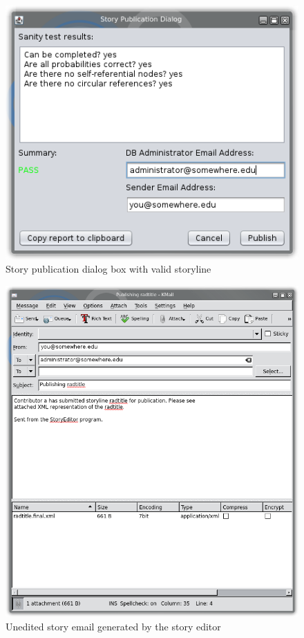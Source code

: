 \documentclass[12pt,letterpaper]{article}
\begin{document}
\begin{figure}
    \begin{center}
        \includegraphics[scale=1]{publicationbox.png}
    \end{center}
    \caption{Story publication dialog box with valid storyline}
\end{figure}

\begin{figure}
    \begin{center}
        \includegraphics[scale=1]{publicationemail.png}
    \end{center}
    \caption{Unedited story email generated by the story editor}
\end{figure}
\end{document}
